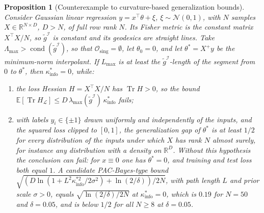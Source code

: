 \documentclass[11pt,reqno]{amsart}
\newtheorem{proposition}[theorem]{Proposition}
\theoremstyle{definition}
\providecommand{\R}{\mathbb{R}}
\newcommand{\E}{\mathbb{E}}
\newcommand{\Fisher}{\mathcal{I}}
\newcommand{\Loss}{\mathcal{L}}
\numberwithin{equation}{section}
\providecommand{\R}{\mathbb{R}}
\begin{document}
\begin{proposition}[Counterexample to curvature-based generalization bounds]
\label{prop:counterexample}
Consider Gaussian linear regression $y = x^\top\theta + \xi$, $\xi \sim \mathcal{N}(0,1)$, with $N$ samples $X \in \R^{N \times D}$, $D > N$, of full row rank $N$. Its Fisher metric is the constant matrix $X^\top X/N$, so $\tilde{g}^{\Fisher}$ is constant and its geodesics are straight lines. Take $\Lambda_{\max} > \operatorname{cond}(\tilde g^{\Fisher})$, so that $\mathcal{O}_{\mathrm{sing}} = \emptyset$, let $\theta_0 = 0$, and let $\theta^* = X^+y$ be the minimum-norm interpolant. If $L_{\max}$ is at least the $\tilde g^{\Fisher}$-length of the segment from $0$ to $\theta^*$, then $\kappa^*_{\mathrm{info}} = 0$, while:
\begin{enumerate}
    \item the loss Hessian $H = X^\top X/N$ has $\operatorname{Tr} H > 0$, so the bound $\E[\operatorname{Tr} H_{\Loss}] \le D\,\lambda_{\max}(\tilde g^{\Fisher})\,\kappa^*_{\mathrm{info}}$ fails;
    \item with labels $y_i \in \{\pm1\}$ drawn uniformly and independently of the inputs, and the squared loss clipped to $[0,1]$, the generalization gap of $\theta^*$ is at least $1/2$ for every distribution of the inputs under which $X$ has rank $N$ almost surely, for instance any distribution with a density on $\R^D$. Without this hypothesis the conclusion can fail: for $x \equiv 0$ one has $\theta^* = 0$, and training and test loss both equal $1$. A candidate PAC-Bayes-type bound $\sqrt{(D\ln(1 + L^2\kappa^{*2}_{\mathrm{info}}/2\sigma^2) + \ln(2/\delta))/2N}$, with path length $L$ and prior scale $\sigma > 0$, equals $\sqrt{\ln(2/\delta)/2N}$ at $\kappa^*_{\mathrm{info}} = 0$, which is $0.19$ for $N = 50$ and $\delta = 0.05$, and is below $1/2$ for all $N \ge 8$ at $\delta = 0.05$.
\end{enumerate}
\end{proposition}
\end{document}
